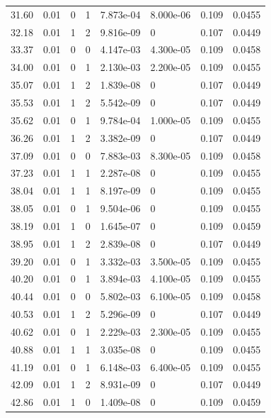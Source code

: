 \documentclass[preview]{standalone}
\begin{document}
{{{\begin{tabular}{L{1.2cm}C{1.2cm} C{0.3cm}C{0.5cm} C{1.4cm}C{1.4cm} C{1.4cm}C{1.4cm}}
  31.60  &  0.01  & 0     &  1 &  7.873e-04  & 8.000e-06  & 0.109 &  0.0455   \\ 
  32.18  &  0.01  & 1     &  2 &  9.816e-09  & 0  & 0.107 &  0.0449   \\ 
  33.37  &  0.01  & 0     &  0 &  4.147e-03  & 4.300e-05  & 0.109 &  0.0458   \\ 
  34.00  &  0.01  & 0     &  1 &  2.130e-03  & 2.200e-05  & 0.109 &  0.0455   \\ 
  35.07  &  0.01  & 1     &  2 &  1.839e-08  & 0  & 0.107 &  0.0449   \\ 
  35.53  &  0.01  & 1     &  2 &  5.542e-09  & 0  & 0.107 &  0.0449   \\ 
  35.62  &  0.01  & 0     &  1 &  9.784e-04  & 1.000e-05  & 0.109 &  0.0455   \\ 
  36.26  &  0.01  & 1     &  2 &  3.382e-09  & 0  & 0.107 &  0.0449   \\ 
  37.09  &  0.01  & 0     &  0 &  7.883e-03  & 8.300e-05  & 0.109 &  0.0458   \\ 
  37.23  &  0.01  & 1     &  1 &  2.287e-08  & 0  & 0.109 &  0.0455   \\ 
  38.04  &  0.01  & 1     &  1 &  8.197e-09  & 0  & 0.109 &  0.0455   \\ 
  38.05  &  0.01  & 0     &  1 &  9.504e-06  & 0  & 0.109 &  0.0455   \\ 
  38.19  &  0.01  & 1     &  0 &  1.645e-07  & 0  & 0.109 &  0.0459   \\ 
  38.95  &  0.01  & 1     &  2 &  2.839e-08  & 0  & 0.107 &  0.0449   \\ 
  39.20  &  0.01  & 0     &  1 &  3.332e-03  & 3.500e-05  & 0.109 &  0.0455   \\ 
  40.20  &  0.01  & 0     &  1 &  3.894e-03  & 4.100e-05  & 0.109 &  0.0455   \\ 
  40.44  &  0.01  & 0     &  0 &  5.802e-03  & 6.100e-05  & 0.109 &  0.0458   \\ 
  40.53  &  0.01  & 1     &  2 &  5.296e-09  & 0  & 0.107 &  0.0449   \\ 
  40.62  &  0.01  & 0     &  1 &  2.229e-03  & 2.300e-05  & 0.109 &  0.0455   \\ 
  40.88  &  0.01  & 1     &  1 &  3.035e-08  & 0  & 0.109 &  0.0455   \\ 
  41.19  &  0.01  & 0     &  1 &  6.148e-03  & 6.400e-05  & 0.109 &  0.0455   \\ 
  42.09  &  0.01  & 1     &  2 &  8.931e-09  & 0  & 0.107 &  0.0449   \\ 
  42.86  &  0.01  & 1     &  0 &  1.409e-08  & 0  & 0.109 &  0.0459   \\ 

\end{tabular}}}}
\end{document}
